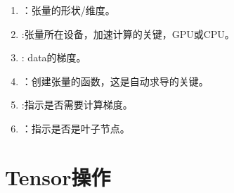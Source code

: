 \begin{enumerate}[label=\arabic*)]
        \item {}：张量的形状/维度。
        \item {}:张量所在设备，加速计算的关键，GPU或CPU。

        \item {}: data的梯度。
        \item {}：创建张量的函数，这是自动求导的关键。
        \item {}:指示是否需要计算梯度。
        \item {}：指示是否是叶子节点。
\end{enumerate}

\section{Tensor操作}
